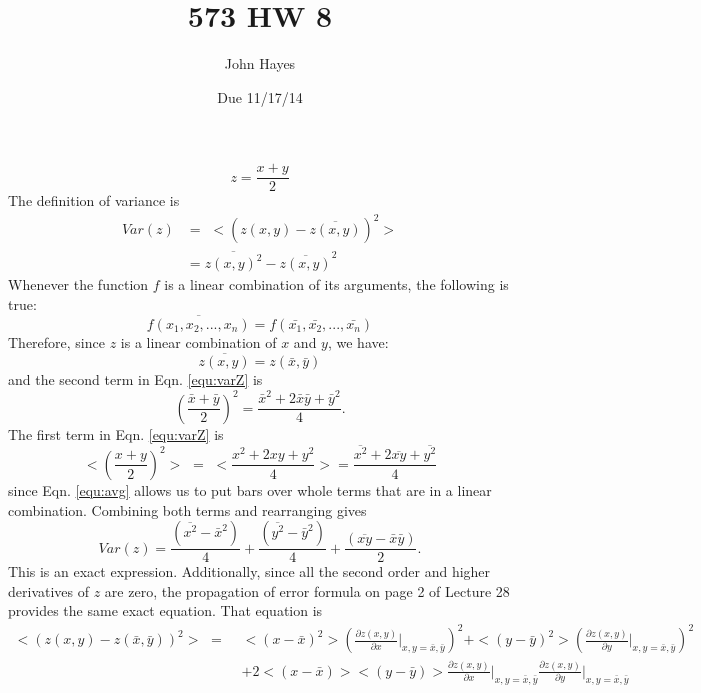 \documentclass[11pt, oneside]{article}   	%
\title{573 HW 8}
\author{John Hayes}
\date{Due 11/17/14}							%
\begin{document}
\maketitle
%
\section{} %
%
\begin{equation}
z = \frac{x + y}{2} 
\end{equation}
%
The definition of variance is
\begin{align}
Var(z) &= \, \, <(z(x,y) - \overline{z(x,y)})^2>  \\
&= \overline{z(x,y)^2} - \overline{z(x,y)}^2 \label{equ:varZ}
\end{align}
Whenever the function $f$ is a linear combination of its arguments, the following is true:
\begin{equation}\label{equ:avg}
 \overline{f(x_1,x_2, ..., x_n)} = f(\bar{x_1}, \bar{x_2}, ..., \bar{x_n})
\end{equation}
Therefore, since $z$ is a linear combination of $x$ and $y$, we have:
\[ \overline{z(x,y)} = z(\bar{x}, \bar{y}) \]
and the second term in Eqn. \eqref{equ:varZ} is
\[ \left(\frac{\bar{x} + \bar{y}}{2} \right)^2 = \frac{\bar{x}^2 + 2 \bar{x}\bar{y} + \bar{y}^2}{4}. \]
The first term in Eqn. \eqref{equ:varZ} is
\[ < \left(\frac{x + y}{2}\right)^2 > \, \, = \, \, < \frac{x^2 + 2xy+ y^2}{4} > = \frac{\overline{x^2} + 2\overline{xy}+ \overline{y^2}}{4} \]
since Eqn. \eqref{equ:avg} allows us to put bars over whole terms that are in a linear combination.  Combining both terms and rearranging gives
\begin{equation}\label{equ:varZfinal}
Var(z) = \frac{\left(\overline{x^2} -  \bar{x}^2 \right)}{4} + \frac{\left(\overline{y^2} -  \bar{y}^2 \right)}{4} + \frac{\left(\overline{xy} -  \bar{x}\bar{y} \right)}{2}. 
\end{equation}
%
This is an exact expression.  Additionally, since all the second order and higher derivatives of $z$ are zero, the propagation of error formula on page 2 of Lecture 28 provides the same exact equation.  That equation is
%
{\small
\begin{equation}\label{equ:properror}
\begin{aligned}
<(z(x,y) - z(\bar{x}, \bar{y}))^2> \, \, = \, \, &< (x- \bar{x})^2 > \left( \frac{\partial z(x,y)}{\partial x} \Bigg\rvert_{x,y=\bar{x},\bar{y}} \right)^2 + < (y- \bar{y})^2 > \left( \frac{\partial z(x,y)}{\partial y} \Bigg\rvert_{x,y=\bar{x},\bar{y}} \right)^2 \\
&+ 2 < (x- \bar{x})>< (y- \bar{y})> \frac{\partial z(x,y)}{\partial x} \Bigg\rvert_{x,y=\bar{x},\bar{y}} \frac{\partial z(x,y)}{\partial y} \Bigg\rvert_{x,y=\bar{x},\bar{y}} 
\end{aligned}
\end{equation}}
\end{document}
